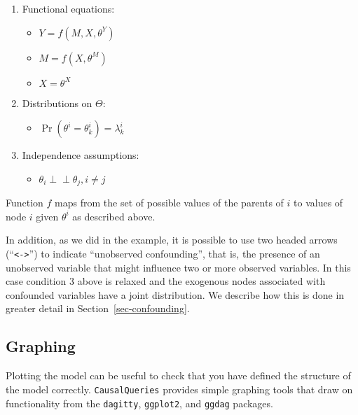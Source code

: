 \documentclass[
  11pt,
  article]{jss}
\providecommand{\tightlist}{%
  \setlength{\itemsep}{0pt}\setlength{\parskip}{0pt}}\usepackage{longtable,booktabs,array}
\begin{document}
\begin{enumerate}
\def\labelenumi{\arabic{enumi}.}
\item
  Functional equations:

  \begin{itemize}
  \tightlist
  \item
    \(Y = f(M, X, \theta^Y)\)
  \item
    \(M = f(X, \theta^M)\)
  \item
    \(X = \theta^X\)
  \end{itemize}
\item
  Distributions on \(\Theta\):

  \begin{itemize}
  \tightlist
  \item
    \(\Pr(\theta^i = \theta^i_k) = \lambda^i_k\)
  \end{itemize}
\item
  Independence assumptions:

  \begin{itemize}
  \tightlist
  \item
    \(\theta_i \perp\!\!\! \perp \theta_j, i\neq j\)
  \end{itemize}
\end{enumerate}

Function \(f\) maps from the set of possible values of the parents of
\(i\) to values of node \(i\) given \(\theta^i\) as described above.

In addition, as we did in the \citet{chickering_clinicians_1996}
example, it is possible to use two headed arrows
(``\texttt{\textless{}-\textgreater{}}'') to indicate ``unobserved
confounding'', that is, the presence of an unobserved variable that
might influence two or more observed variables. In this case condition 3
above is relaxed and the exogenous nodes associated with confounded
variables have a joint distribution. We describe how this is done in
greater detail in Section~\ref{sec-confounding}.

\hypertarget{graphing}{%
\subsection{Graphing}\label{graphing}}

Plotting the model can be useful to check that you have defined the
structure of the model correctly. \texttt{CausalQueries} provides simple
graphing tools that draw on functionality from the \texttt{dagitty},
\texttt{ggplot2}, and \texttt{ggdag} packages.
\end{document}
